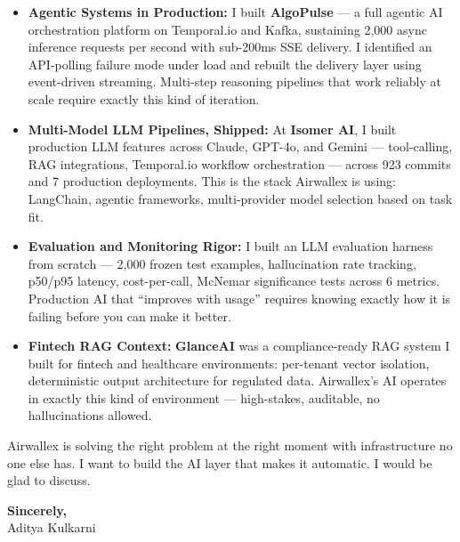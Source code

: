 \documentclass[11pt,letterpaper]{article}
\begin{document}
\begin{itemize}[leftmargin=*, itemsep=3pt, label={\color{AirwallexNavy}\faAngleRight}]
    \item \textbf{Agentic Systems in Production:} I built \textbf{AlgoPulse} --- a full agentic AI orchestration platform on Temporal.io and Kafka, sustaining 2,000 async inference requests per second with sub-200ms SSE delivery. I identified an API-polling failure mode under load and rebuilt the delivery layer using event-driven streaming. Multi-step reasoning pipelines that work reliably at scale require exactly this kind of iteration.

    \item \textbf{Multi-Model LLM Pipelines, Shipped:} At \textbf{Isomer AI}, I built production LLM features across Claude, GPT-4o, and Gemini --- tool-calling, RAG integrations, Temporal.io workflow orchestration --- across 923 commits and 7 production deployments. This is the stack Airwallex is using: LangChain, agentic frameworks, multi-provider model selection based on task fit.

    \item \textbf{Evaluation and Monitoring Rigor:} I built an LLM evaluation harness from scratch --- 2,000 frozen test examples, hallucination rate tracking, p50/p95 latency, cost-per-call, McNemar significance tests across 6 metrics. Production AI that ``improves with usage'' requires knowing exactly how it is failing before you can make it better.

    \item \textbf{Fintech RAG Context:} \textbf{GlanceAI} was a compliance-ready RAG system I built for fintech and healthcare environments: per-tenant vector isolation, deterministic output architecture for regulated data. Airwallex's AI operates in exactly this kind of environment --- high-stakes, auditable, no hallucinations allowed.
\end{itemize}

\vspace{6pt}

Airwallex is solving the right problem at the right moment with infrastructure no one else has. I want to build the AI layer that makes it automatic. I would be glad to discuss.

\vspace{12pt}

\textbf{Sincerely,}\\[8pt]
Aditya Kulkarni
\end{document}
